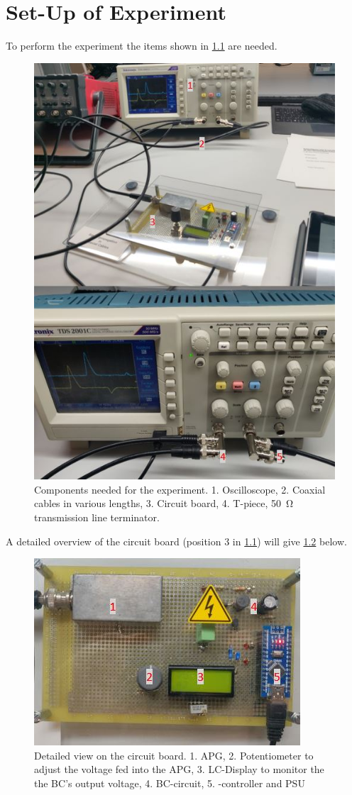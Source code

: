 \chapter{Set-Up of Experiment}
    To perform the experiment the items shown in \cref{fig:setup} are needed.
    \begin{figure}[H]
        \centering
            \includegraphics[width=.7\textwidth]{aufbau/setup_num.JPG}
        \caption{Components needed for the experiment. 1. Oscilloscope, 2. Coaxial cables in various lengths, 3. Circuit board, 4. T-piece, \SI{50}{\ohm} transmission line terminator.}
        \label{fig:setup}
    \end{figure}
    A detailed overview of the circuit board (position 3 in \cref{fig:setup}) will give \cref{fig:circuit_board} below.
    \begin{figure}[H]
        \centering
        \includegraphics[width=.7\textwidth]{aufbau/circuit_board_num.JPG}
        \caption{Detailed view on the circuit board. 1. APG, 2. Potentiometer to adjust the voltage fed into the APG, 3. LC-Display to monitor
        the the BC's output voltage, 4. BC-circuit, 5. \micro-controller and PSU}
        \label{fig:circuit_board}
    \end{figure}
